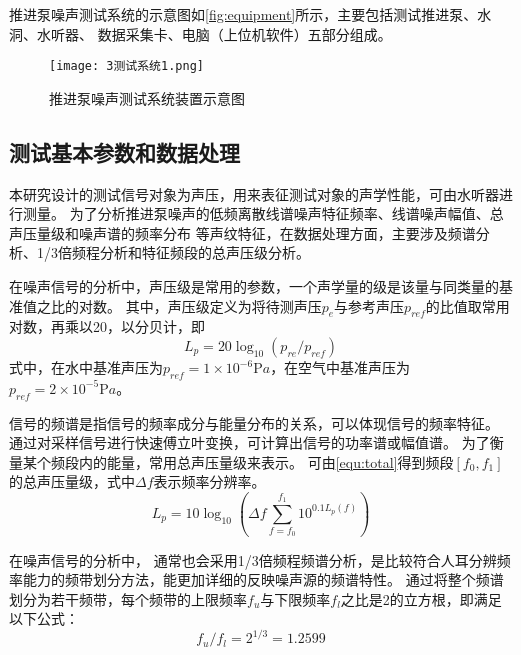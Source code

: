 推进泵噪声测试系统的示意图如\autoref{fig:equipment}所示，主要包括测试推进泵、水洞、水听器、
数据采集卡、电脑（上位机软件）五部分组成。
\begin{figure}[htbp]
    \centering
    \texttt{[image: 3测试系统1.png]}
    \caption{\label{fig:equipment}推进泵噪声测试系统装置示意图}
\end{figure}

\subsection{测试基本参数和数据处理}
本研究设计的测试信号对象为声压，用来表征测试对象的声学性能，可由水听器进行测量。
为了分析推进泵噪声的低频离散线谱噪声特征频率、线谱噪声幅值、总声压量级和噪声谱的频率分布
等声纹特征，在数据处理方面，主要涉及频谱分析、1/3倍频程分析和特征频段的总声压级分析。

在噪声信号的分析中，声压级是常用的参数，一个声学量的级是该量与同类量的基准值之比的对数。
其中，声压级定义为将待测声压$p_e$与参考声压$p_{ref}$的比值取常用对数，再乘以20，以分贝计，即
\begin{equation}
    \label{equ:p}
    L_{p} = 20\log_{10}{\left(p_{re}/p_{ref}\right )}
\end{equation}
式中，在水中基准声压为$p_{ref}= 1\times 10^{-6} \mathrm{P} a$，在空气中基准声压为$p_{ref}= 2\times 10^{-5} \mathrm{P} a$。
\begin{comment}
同理，振动加速度级也定义为加速度有效值$a_e$与基准加速度$a_{ref}$之比的以10为底的对数，再乘以20，以分贝计，即
\begin{equation}
    \label{equ:a}
    L_{a} = 20\log_{10}{\left(a_{re}/a_{ref}\right )}
\end{equation}
式中，基准加速度值为$a_{ref}= 1\times 10^{-6} \mathrm{m/s^2} $。
\end{comment}
信号的频谱是指信号的频率成分与能量分布的关系，可以体现信号的频率特征。
通过对采样信号进行快速傅立叶变换，可计算出信号的功率谱或幅值谱。
为了衡量某个频段内的能量，常用总声压量级来表示。
可由\autoref{equ:total}得到频段$\left [ f_0,f_1 \right ]$的总声压量级，式中$\Delta f$表示频率分辨率\cite{}。
\begin{equation}
    \label{equ:total}
    L_p=10\log_{10}{\left (\Delta f \sum_{f=f_0}^{f_1}10^{0.1L_p\left ( f \right )}    \right )  } 
\end{equation}

在噪声信号的分析中，
通常也会采用1/3倍频程频谱分析，是比较符合人耳分辨频率能力的频带划分方法，能更加详细的反映噪声源的频谱特性。
通过将整个频谱划分为若干频带，每个频带的上限频率$f_u$与下限频率$f_l$之比是2的立方根，即满足以下公式：
\begin{equation}
    \label{equ:fu}
    f_{u}/f_{l}=2^{1/3}=1.2599
\end{equation}

